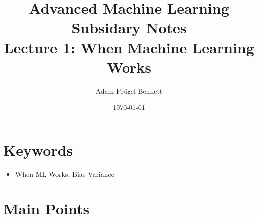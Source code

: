 \documentclass[11pt]{article}
\author{Adam Prügel-Bennett}
\date{\today}
\title{Advanced Machine Learning Subsidary Notes\\\medskip
\large Lecture 1: When Machine Learning Works}
\begin{document}
\maketitle


\section{Keywords}
\label{sec:orgb90f535}
\begin{itemize}
\item When ML Works, Bias Variance
\end{itemize}


\section{Main Points}
\label{sec:org732466c}
\end{document}
